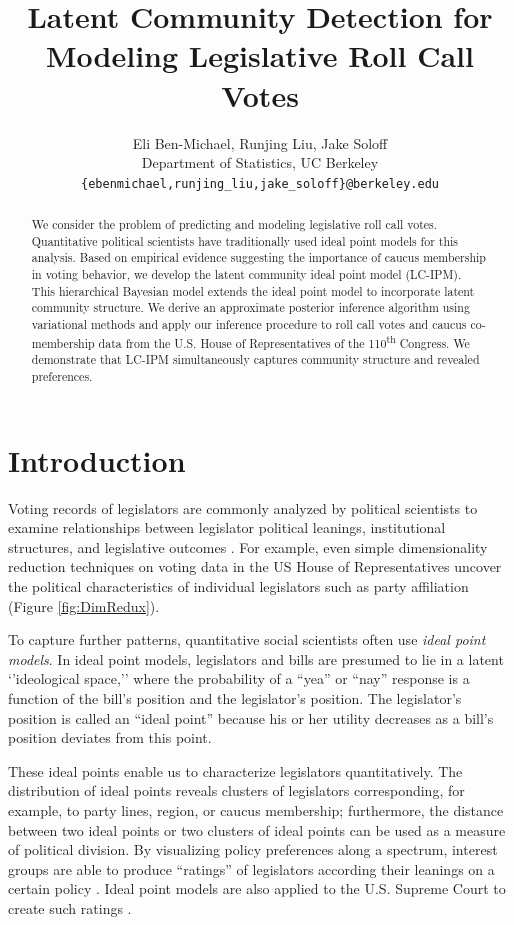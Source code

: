 \documentclass{article}
\title{Latent Community Detection for Modeling Legislative Roll Call Votes}
\author{
  Eli Ben-Michael, Runjing Liu, Jake Soloff \\
  Department of Statistics, UC Berkeley\\
  \texttt{\{ebenmichael,runjing\_liu,jake\_soloff\}@berkeley.edu}
}
\begin{document}

\maketitle

\vspace{-1em}

\begin{abstract}
We consider the problem of predicting and modeling legislative roll call votes. Quantitative political scientists have traditionally used ideal point models for this analysis. Based on empirical evidence suggesting the importance of caucus membership in voting behavior, we develop the latent community ideal point model (LC-IPM). This hierarchical Bayesian model extends the ideal point model to incorporate latent community structure. We derive an approximate posterior inference algorithm using variational methods and apply our inference procedure to roll call votes and caucus co-membership data from the U.S. House of Representatives of the 110\textsuperscript{th} Congress. We demonstrate that LC-IPM simultaneously captures community structure and revealed preferences.
\end{abstract}

\section{Introduction}
\label{introduction}
Voting records of legislators are commonly analyzed by political scientists to examine relationships between legislator political leanings, institutional structures, and legislative outcomes \cite{Clinton2004}. For example, even simple dimensionality reduction techniques on voting data in the US House of Representatives uncover the political characteristics of individual legislators such as party affiliation (Figure \ref{fig:DimRedux}). \par

To capture further patterns, quantitative social scientists often use \textit{ideal point models}. In ideal point models, legislators and bills are presumed to lie in a latent `'ideological space,'' where the probability of a ``yea'' or ``nay'' response is a function of the bill's position and the legislator's position. The legislator's position is called an ``ideal point'' because his or her utility decreases as a bill's position deviates from this point. \par

These ideal points enable us to characterize legislators quantitatively. The distribution of ideal points reveals clusters of legislators corresponding, for example, to party lines, region, or caucus membership; furthermore, the distance between two ideal points or two clusters of ideal points can be used as  a measure of political division. By visualizing policy preferences along a spectrum, interest groups are able to produce ``ratings'' of legislators according their leanings on a certain policy \cite{Clinton2004}. Ideal point models are also applied to the U.S. Supreme Court to create such ratings \cite{Martin2002}. \par
\end{document}
